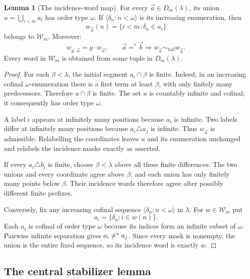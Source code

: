 \documentclass[11pt,letterpaper]{article}
\theoremstyle{definition}
\newtheorem{lemma}[definition]{Lemma}
\numberwithin{equation}{section}
\newcommand{\Tail}{\mathrel{\sim_{\mathrm{tail}}}}
\newcommand{\W}{\mathcal W}
\newcommand{\Efin}{\mathrel{=^*}}
\begin{document}
\begin{lemma}[The incidence-word map]\label{lem:incidence}
For every $\vec a\in D_m(\lambda)$, its union $u=\bigcup_{i<m}a_i$ has order type $\omega$. If $\langle\delta_n:n<\omega\rangle$ is its increasing enumeration, then
\begin{equation}\label{eq:incidence}
 w_{\vec a}(n)=\{i<m:\delta_n\in a_i\}
\end{equation}
belongs to $\W_m$. Moreover:
\[
 w_{g\cdot\vec a}=g\cdot w_{\vec a},\qquad
 \vec a\Efin\vec b\Longrightarrow w_{\vec a}\Tail w_{\vec b}.
\]
Every word in $\W_m$ is obtained from some tuple in $D_m(\lambda)$.
\end{lemma}

\begin{proof}
For each $\beta<\lambda$, the initial segment $a_i\cap\beta$ is finite. Indeed, in an increasing cofinal $\omega$-enumeration there is a first term at least $\beta$, with only finitely many predecessors. Therefore $u\cap\beta$ is finite. The set $u$ is countably infinite and cofinal; it consequently has order type $\omega$.

A label $i$ appears at infinitely many positions because $a_i$ is infinite. Two labels differ at infinitely many positions because $a_i\triangle a_j$ is infinite. Thus $w_{\vec a}$ is admissible. Relabelling the coordinates leaves $u$ and its enumeration unchanged and relabels the incidence masks exactly as asserted.

If every $a_i\triangle b_i$ is finite, choose $\beta<\lambda$ above all these finite differences. The two unions and every coordinate agree above $\beta$, and each union has only finitely many points below $\beta$. Their incidence words therefore agree after possibly different finite prefixes.

Conversely, fix any increasing cofinal sequence $\langle\delta_n:n<\omega\rangle$ in $\lambda$. For $w\in\W_m$ put
\[
 a_i=\{\delta_n:i\in w(n)\}.
\]
Each $a_i$ is cofinal of order type $\omega$ because its indices form an infinite subset of $\omega$. Pairwise infinite separation gives $a_i\not\Efin a_j$. Since every mask is nonempty, the union is the entire fixed sequence, so its incidence word is exactly $w$.
\end{proof}

\subsection{The central stabilizer lemma}
\end{document}
